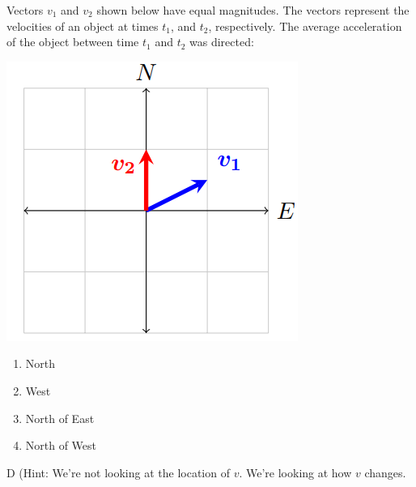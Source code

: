 \newpage
\begin{question}
Vectors $v_1$ and $v_2$ shown below have equal magnitudes. The vectors represent the velocities of an object at times $t_1$, and $t_2$, respectively. The average acceleration of the object between time $t_1$ and $t_2$ was directed:

\includegraphics{Figures/Figure13}
\begin{multicols}{4}
\begin{enumerate}[label=(\alph*)]
    \item North
    \item West
    \item North of East
    \item North of West
\end{enumerate}
\end{multicols}

\end{question}

\begin{solution}
D (Hint: We're not looking at the location of $v$. We're looking at how $v$ changes.
\end{solution}

